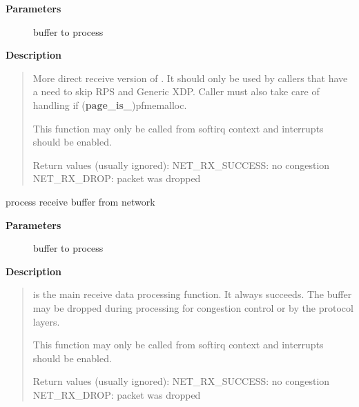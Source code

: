 \documentclass[a4paper,8pt,english]{sphinxmanual}
\begin{document}
\textbf{Parameters}
\begin{description}
\item[{}] \leavevmode
buffer to process

\end{description}

\textbf{Description}
\begin{quote}

More direct receive version of {\hyperref[networking/kapi:c.netif_receive_skb]{\emph{}}}.  It should
only be used by callers that have a need to skip RPS and Generic XDP.
Caller must also take care of handling if ({\color{red}\bfseries{}page\_is\_})pfmemalloc.

This function may only be called from softirq context and interrupts
should be enabled.

Return values (usually ignored):
NET\_RX\_SUCCESS: no congestion
NET\_RX\_DROP: packet was dropped
\end{quote}

\begin{fulllineitems}
\label{networking/kapi:c.netif_receive_skb}
process receive buffer from network

\end{fulllineitems}


\textbf{Parameters}
\begin{description}
\item[{}] \leavevmode
buffer to process

\end{description}

\textbf{Description}
\begin{quote}

{\hyperref[networking/kapi:c.netif_receive_skb]{\emph{}}} is the main receive data processing function.
It always succeeds. The buffer may be dropped during processing
for congestion control or by the protocol layers.

This function may only be called from softirq context and interrupts
should be enabled.

Return values (usually ignored):
NET\_RX\_SUCCESS: no congestion
NET\_RX\_DROP: packet was dropped
\end{quote}
\end{document}
